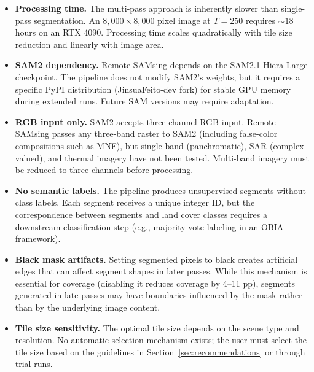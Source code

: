 \documentclass[review,11pt,authoryear]{elsarticle}
\begin{document}
\begin{itemize}
    \item \textbf{Processing time.} The multi-pass approach is inherently slower than single-pass segmentation. An $8{,}000 \times 8{,}000$ pixel image at $T = 250$ requires ${\sim}18$ hours on an RTX 4090. Processing time scales quadratically with tile size reduction and linearly with image area.

    \item \textbf{SAM2 dependency.} Remote SAMsing depends on the SAM2.1 Hiera Large checkpoint. The pipeline does not modify SAM2's weights, but it requires a specific PyPI distribution (JinsuaFeito-dev fork) for stable GPU memory during extended runs. Future SAM versions may require adaptation.

    \item \textbf{RGB input only.} SAM2 accepts three-channel RGB input. Remote SAMsing passes any three-band raster to SAM2 (including false-color compositions such as MNF), but single-band (panchromatic), SAR (complex-valued), and thermal imagery have not been tested. Multi-band imagery must be reduced to three channels before processing.

    \item \textbf{No semantic labels.} The pipeline produces unsupervised segments without class labels. Each segment receives a unique integer ID, but the correspondence between segments and land cover classes requires a downstream classification step (e.g., majority-vote labeling in an OBIA framework).

    \item \textbf{Black mask artifacts.} Setting segmented pixels to black creates artificial edges that can affect segment shapes in later passes. While this mechanism is essential for coverage (disabling it reduces coverage by 4--11 pp), segments generated in late passes may have boundaries influenced by the mask rather than by the underlying image content.

    \item \textbf{Tile size sensitivity.} The optimal tile size depends on the scene type and resolution. No automatic selection mechanism exists; the user must select the tile size based on the guidelines in Section~\ref{sec:recommendations} or through trial runs.
\end{itemize}


\end{document}
